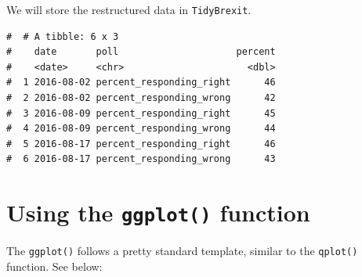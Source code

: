 \documentclass[letterpaper,12pt,twoside,]{pinp}
\begin{document}
We will store the restructured data in \texttt{TidyBrexit}.

\begin{Shaded}
\begin{Highlighting}[]
\OtherTok{\textless{}{-}}\SpecialCharTok{\%\textgreater{}\%} \NormalTok{(}\SpecialCharTok{{-}}
                                   \NormalTok{, }
                                   \NormalTok{)}
\end{Highlighting}
\end{Shaded}

\begin{ShadedResult}
\begin{verbatim}
#  # A tibble: 6 x 3
#    date       poll                     percent
#    <date>     <chr>                      <dbl>
#  1 2016-08-02 percent_responding_right      46
#  2 2016-08-02 percent_responding_wrong      42
#  3 2016-08-09 percent_responding_right      45
#  4 2016-08-09 percent_responding_wrong      44
#  5 2016-08-17 percent_responding_right      46
#  6 2016-08-17 percent_responding_wrong      43
\end{verbatim}
\end{ShadedResult}

\hypertarget{using-the-ggplot-function}{%
\section{\texorpdfstring{Using the \texttt{ggplot()}
function}{Using the ggplot() function}}\label{using-the-ggplot-function}}

The \texttt{ggplot()} follows a pretty standard template, similar to the
\texttt{qplot()} function. See below:

\begin{Shaded}
\begin{Highlighting}[]
\SpecialCharTok{\textless{}}\SpecialCharTok{\textgreater{}} \SpecialCharTok{\%\textgreater{}\%} 
  \NormalTok{(} \NormalTok{(} \SpecialCharTok{\textless{}}\SpecialCharTok{\textgreater{}}\NormalTok{, } \SpecialCharTok{\textless{}}\SpecialCharTok{\textgreater{}}\NormalTok{))}
\end{Highlighting}
\end{Shaded}
\end{document}
